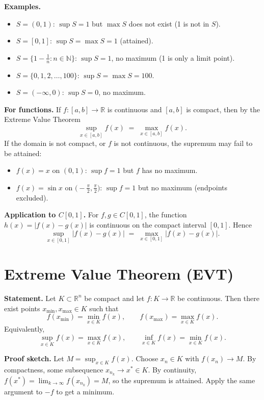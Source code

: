 \documentclass[12pt,a4paper]{article}
\theoremstyle{plain}
\theoremstyle{definition}
\theoremstyle{remark}
\theoremstyle{remark}
\begin{document}
\noindent\textbf{Examples.}
\begin{itemize}
	\item $S=(0,1)$: $\sup S=1$ but $\max S$ does not exist (1 is not in $S$).
	\item $S=[0,1]$: $\sup S=\max S=1$ (attained).
	\item $S=\{1-\tfrac1n:n\in\mathbb{N}\}$: $\sup S=1$, no maximum (1 is only a limit point).
	\item $S=\{0,1,2,\dots,100\}$: $\sup S=\max S=100$.
	\item $S=(-\infty,0)$: $\sup S=0$, no maximum.
\end{itemize}

\smallskip

\noindent\textbf{For functions.}
If $f:[a,b]\to\mathbb{R}$ is continuous and $[a,b]$ is compact, then by the Extreme Value Theorem
\[
\sup_{x\in[a,b]} f(x) \;=\; \max_{x\in[a,b]} f(x).
\]
If the domain is not compact, or $f$ is not continuous, the supremum may fail to be attained:
\begin{itemize}
	\item $f(x)=x$ on $(0,1)$: $\sup f=1$ but $f$ has no maximum.
	\item $f(x)=\sin x$ on $\bigl(-\tfrac{\pi}{2},\tfrac{\pi}{2}\bigr)$: $\sup f=1$ but no maximum (endpoints excluded).
\end{itemize}

\smallskip

\noindent\textbf{Application to $C[0,1]$.}
For $f,g\in C[0,1]$, the function $h(x)=|f(x)-g(x)|$ is continuous on the compact interval $[0,1]$.
Hence
\[
\sup_{x\in[0,1]} |f(x)-g(x)| \;=\; \max_{x\in[0,1]} |f(x)-g(x)|.
\]

\section*{Extreme Value Theorem (EVT)}

\noindent\textbf{Statement.}
Let $K\subset\mathbb{R}^n$ be compact and let $f:K\to\mathbb{R}$ be continuous.
Then there exist points $x_{\min},x_{\max}\in K$ such that
\[
f(x_{\min})=\min_{x\in K} f(x), \qquad f(x_{\max})=\max_{x\in K} f(x).
\]
Equivalently,
\[
\sup_{x\in K} f(x)=\max_{x\in K} f(x), \qquad \inf_{x\in K} f(x)=\min_{x\in K} f(x).
\]

\smallskip

\noindent\textbf{Proof sketch.}
Let $M=\sup_{x\in K} f(x)$. Choose $x_n\in K$ with $f(x_n)\to M$.
By compactness, some subsequence $x_{n_k}\to x^*\in K$.
By continuity, $f(x^*)=\lim_{k\to\infty} f(x_{n_k})=M$, so the supremum is attained.
Apply the same argument to $-f$ to get a minimum.
\end{document}
